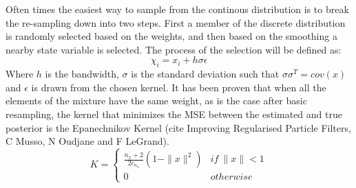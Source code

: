 \documentclass{article}
\begin{document}
Often times the easiest way to sample from the continous distribution is to break the 
re-sampling down into two steps. First a member of the discrete distribution is randomly
selected based on the weights, and then based on the smoothing a nearby state variable 
is selected. The process of the selection will be defined as:
\begin{equation}
\chi_i = x_i + h\sigma \epsilon
\end{equation}
Where $h$ is the bandwidth, $\sigma$ is the standard deviation such that $\sigma \sigma^T = cov(x)$
and $\epsilon$ is drawn from the chosen kernel.
It has been proven that when all the elements of the mixture
have the same weight, as is the case after basic resampling, the kernel that minimizes the 
MSE between the estimated and true posterior is the Epanechnikov Kernel (cite Improving Regularised
Particle Filters, C Musso, N Oudjane and F LeGrand). 
\begin{equation}
K = \left\{
\begin{array}{lr}
\frac{n_x+2}{2c_{n_x}}(1-\|x\|^2) & if\ \|x\| < 1\\
0 & otherwise
\end{array}\right.
\end{equation}
\end{document}
